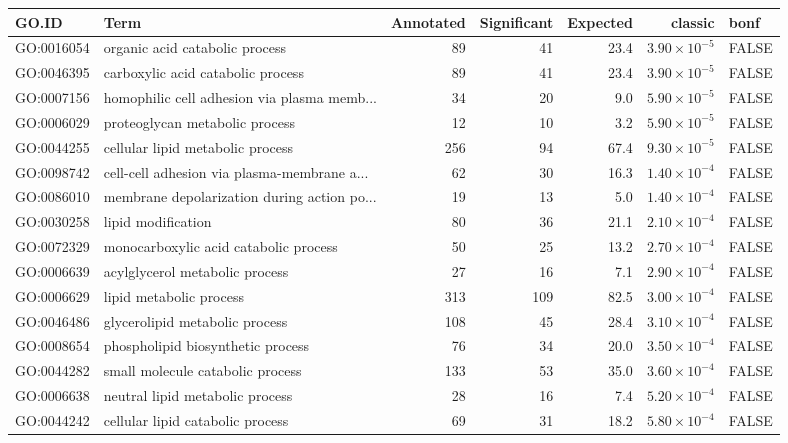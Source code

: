\begin{table}[ht]
\centering
\begin{adjustbox}{max width=\textwidth}
\begin{tabular}{llrrrrl}
  \hline
GO.ID & Term & Annotated & Significant & Expected & classic & bonf \\ 
  \hline
GO:0016054 & organic acid catabolic process & 89 & 41 & 23.4 & $3.90 \times 10^{-5}$ & FALSE \\ 
  GO:0046395 & carboxylic acid catabolic process & 89 & 41 & 23.4 & $3.90 \times 10^{-5}$ & FALSE \\ 
  GO:0007156 & homophilic cell adhesion via plasma memb... & 34 & 20 & 9.0 & $5.90 \times 10^{-5}$ & FALSE \\ 
  GO:0006029 & proteoglycan metabolic process & 12 & 10 & 3.2 & $5.90 \times 10^{-5}$ & FALSE \\ 
  GO:0044255 & cellular lipid metabolic process & 256 & 94 & 67.4 & $9.30 \times 10^{-5}$ & FALSE \\ 
  GO:0098742 & cell-cell adhesion via plasma-membrane a... & 62 & 30 & 16.3 & $1.40 \times 10^{-4}$ & FALSE \\ 
  GO:0086010 & membrane depolarization during action po... & 19 & 13 & 5.0 & $1.40 \times 10^{-4}$ & FALSE \\ 
  GO:0030258 & lipid modification & 80 & 36 & 21.1 & $2.10 \times 10^{-4}$ & FALSE \\ 
  GO:0072329 & monocarboxylic acid catabolic process & 50 & 25 & 13.2 & $2.70 \times 10^{-4}$ & FALSE \\ 
  GO:0006639 & acylglycerol metabolic process & 27 & 16 & 7.1 & $2.90 \times 10^{-4}$ & FALSE \\ 
  GO:0006629 & lipid metabolic process & 313 & 109 & 82.5 & $3.00 \times 10^{-4}$ & FALSE \\ 
  GO:0046486 & glycerolipid metabolic process & 108 & 45 & 28.4 & $3.10 \times 10^{-4}$ & FALSE \\ 
  GO:0008654 & phospholipid biosynthetic process & 76 & 34 & 20.0 & $3.50 \times 10^{-4}$ & FALSE \\ 
  GO:0044282 & small molecule catabolic process & 133 & 53 & 35.0 & $3.60 \times 10^{-4}$ & FALSE \\ 
  GO:0006638 & neutral lipid metabolic process & 28 & 16 & 7.4 & $5.20 \times 10^{-4}$ & FALSE \\ 
  GO:0044242 & cellular lipid catabolic process & 69 & 31 & 18.2 & $5.80 \times 10^{-4}$ & FALSE \\ 

\end{tabular}
\end{adjustbox}
\end{table}
